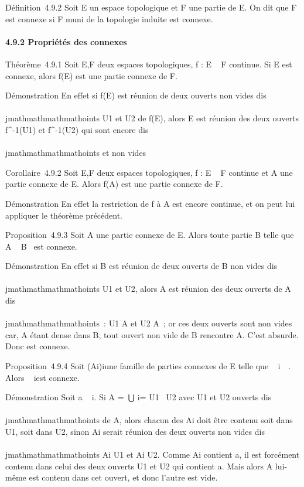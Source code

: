 Définition~4.9.2 Soit E un espace topologique et F une partie de E. On
dit que F est connexe si F muni de la topologie induite est connexe.

\paragraph{4.9.2 Propriétés des connexes}

Théorème~4.9.1 Soit E,F deux espaces topologiques, f : E \rightarrow~ F continue.
Si E est connexe, alors f(E) est une partie connexe de F.

Démonstration En effet si f(E) est réunion de deux ouverts non vides
dis\\\\jmathmathmathmathoints U1 et U2 de f(E), alors E est réunion des
deux ouverts f^-1(U1) et
f^-1(U2) qui sont encore dis\\\\jmathmathmathmathoints et non vides

Corollaire~4.9.2 Soit E,F deux espaces topologiques, f : E \rightarrow~ F continue
et A une partie connexe de E. Alors f(A) est une partie connexe de F.

Démonstration En effet la restriction de f à A est encore continue, et
on peut lui appliquer le théorème précédent.

Proposition~4.9.3 Soit A une partie connexe de E. Alors toute partie B
telle que A \subset~ B \subset~\overlineA est connexe.

Démonstration En effet si B est réunion de deux ouverts de B non vides
dis\\\\jmathmathmathmathoints U1 et U2, alors A est réunion des deux
ouverts de A dis\\\\jmathmathmathmathoints~: U1 \bigcap A et U2 \bigcap A~; or ces
deux ouverts sont non vides car, A étant dense dans B, tout ouvert non
vide de B rencontre A. C'est absurde. Donc \overlineA
est connexe.

Proposition~4.9.4 Soit (Ai)i\inI une famille de
parties connexes de E telle que
\⋂ ~
i\inIAi\neq~\varnothing~. Alors
\⋃ ~
i\inIAi est connexe.

Démonstration Soit a
\in\⋂ ~
i\inIAi. Si A =\
⋃  i\inIAi = U1~ \cup
U2 avec U1 et U2 ouverts dis\\\\jmathmathmathmathoints de A,
alors chacun des Ai doit être contenu soit dans U1,
soit dans U2, sinon Ai serait réunion des deux
ouverts non vides dis\\\\jmathmathmathmathoints Ai \bigcap U1 et Ai
\bigcap U2. Comme Ai contient a, il est forcément contenu
dans celui des deux ouverts U1 et U2 qui contient a.
Mais alors A lui-même est contenu dans cet ouvert, et donc l'autre est
vide.

